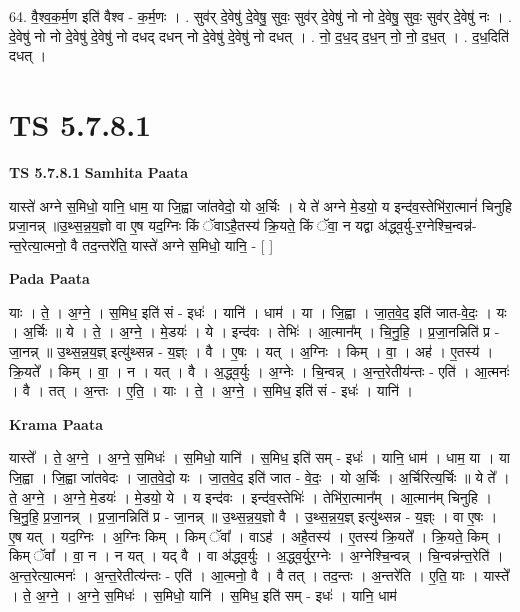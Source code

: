 \documentclass[17pt]{extarticle}
\begin{document}
64. वै॒श्व॒क॒र्म॒ण इति॑ वैश्व - क॒र्म॒णः । . सुव॑र् दे॒वेषु॑ दे॒वेषु॒ सुवः॒ सुव॑र् दे॒वेषु॑ नो नो दे॒वेषु॒ सुवः॒ सुव॑र् दे॒वेषु॑ नः । . दे॒वेषु॑ नो नो दे॒वेषु॑ दे॒वेषु॑ नो दधद् दधन् नो दे॒वेषु॑ दे॒वेषु॑ नो दधत् । . नो॒ द॒ध॒द् द॒ध॒न् नो॒ नो॒ द॒ध॒त् । . द॒ध॒दिति॑ दधत् । \newline
\pagebreak
{}

\section{ TS 5.7.8.1 }

\textbf{TS 5.7.8.1 } \newline
\textbf{Samhita Paata} \newline

यास्ते॑ अग्ने स॒मिधो॒ यानि॒ धाम॒ या जि॒ह्वा जा॑तवेदो॒ यो अ॒र्चिः । ये ते॑ अग्ने मे॒डयो॒ य इन्द॑व॒स्तेभि॑रा॒त्मानं॑ चिनुहि प्रजा॒नन्न् ॥उ॒थ्स॒न्न॒य॒ज्ञो वा ए॒ष यद॒ग्निः किं ॅवाऽहै॒तस्य॑ क्रि॒यते॒ किं ॅवा॒ न यद्वा अ॑द्ध्व॒र्यु-र॒ग्नेश्चि॒न्वन्न॑-न्त॒रेत्या॒त्मनो॒ वै तद॒न्तरे॑ति॒ यास्ते॑ अग्ने स॒मिधो॒ यानि॒ - [  ] \newline

\textbf{Pada Paata} \newline

याः । ते॒ । अ॒ग्ने॒ । स॒मिध॒ इति॑ सं - इधः॑ । यानि॑ । धाम॑ । या । जि॒ह्वा । जा॒त॒वे॒द॒ इति॑ जात-वे॒दः॒ । यः । अ॒र्चिः ॥ ये । ते॒ । अ॒ग्ने॒ । मे॒डयः॑ । ये । इन्द॑वः । तेभिः॑ । आ॒त्मान᳚म् । चि॒नु॒हि॒ । प्र॒जा॒नन्निति॑ प्र - जा॒नन्न् ॥ उ॒थ्स॒न्न॒य॒ज्ञ् इत्यु॑थ्सन्न - य॒ज्ञ्ः । वै । ए॒षः । यत् । अ॒ग्निः । किम् । वा॒ । अह॑ । ए॒तस्य॑ । क्रि॒यते᳚ । किम् । वा॒ । न । यत् । वै । अ॒द्ध्व॒र्युः । अ॒ग्नेः । चि॒न्वन्न् । अ॒न्त॒रेतीय॑न्तः - एति॑ । आ॒त्मनः॑ । वै । तत् । अ॒न्तः । ए॒ति॒ । याः । ते॒ । अ॒ग्ने॒ । स॒मिध॒ इति॑ सं - इधः॑ । यानि॑ ।  \newline


\textbf{Krama Paata} \newline

यास्ते᳚ । ते॒ अ॒ग्ने॒ । अ॒ग्ने॒ स॒मिधः॑ । स॒मिधो॒ यानि॑ । स॒मिध॒ इति॑ सम् - इधः॑ । यानि॒ धाम॑ । धाम॒ या । या जि॒ह्वा । जि॒ह्वा जा॑तवेदः । जा॒त॒वे॒दो॒ यः । जा॒त॒वे॒द॒ इति॑ जात - वे॒दः॒ । यो अ॒र्चिः । अ॒र्चिरित्य॒र्चिः ॥ ये ते᳚ । ते॒ अ॒ग्ने॒ । अ॒ग्ने॒ मे॒डयः॑ । मे॒डयो॒ ये । य इन्द॑वः । इन्द॑व॒स्तेभिः॑ । तेभि॑रा॒त्मान᳚म् । आ॒त्मान॑म् चिनुहि । चि॒नु॒हि॒ प्र॒जा॒नन्न् । प्र॒जा॒नन्निति॑ प्र - जा॒नन्न् ॥ उ॒थ्स॒न्न॒य॒ज्ञो वै । उ॒थ्स॒न्न॒य॒ज्ञ् इत्यु॑थ्सन्न - य॒ज्ञ्ः । वा ए॒षः । ए॒ष यत् । यद॒ग्निः । अ॒ग्निः किम् । किम् ॅवा᳚ । वाऽह॑ । अहै॒तस्य॑ । ए॒तस्य॑ क्रि॒यते᳚ । क्रि॒यते॒ किम् । किम् ॅवा᳚ । वा॒ न । न यत् । यद् वै । वा अ॑द्ध्व॒र्युः । अ॒द्ध्व॒र्युर॒ग्नेः । अ॒ग्नेश्चि॒न्वन्न् । चि॒न्वन्न॑न्त॒रेति॑ । अ॒न्त॒रेत्या॒त्मनः॑ । अ॒न्त॒रेतीत्य॑न्तः - एति॑ । आ॒त्मनो॒ वै । वै तत् । तद॒न्तः । अ॒न्तरे॑ति । ए॒ति॒ याः । यास्ते᳚ । ते॒ अ॒ग्ने॒ । अ॒ग्ने॒ स॒मिधः॑ । स॒मिधो॒ यानि॑ । स॒मिध॒ इति॑ सम् - इधः॑ । यानि॒ धाम॑ \newline
\end{document}
